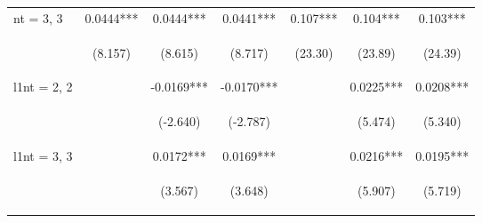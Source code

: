 \documentclass[]{article}
\begin{document}
\begin{center}
\begin{tabular}{lcccccc}
nt = 3, 3 & 0.0444*** & 0.0444*** & 0.0441*** & 0.107*** & 0.104*** & 0.103*** \\
\vspace{4pt} & \begin{footnotesize}(8.157)\end{footnotesize} & \begin{footnotesize}(8.615)\end{footnotesize} & \begin{footnotesize}(8.717)\end{footnotesize} & \begin{footnotesize}(23.30)\end{footnotesize} & \begin{footnotesize}(23.89)\end{footnotesize} & \begin{footnotesize}(24.39)\end{footnotesize} \\
l1nt = 2, 2 &  & -0.0169*** & -0.0170*** &  & 0.0225*** & 0.0208*** \\
\vspace{4pt} & \begin{footnotesize}\end{footnotesize} & \begin{footnotesize}(-2.640)\end{footnotesize} & \begin{footnotesize}(-2.787)\end{footnotesize} & \begin{footnotesize}\end{footnotesize} & \begin{footnotesize}(5.474)\end{footnotesize} & \begin{footnotesize}(5.340)\end{footnotesize} \\
l1nt = 3, 3 &  & 0.0172*** & 0.0169*** &  & 0.0216*** & 0.0195*** \\
\vspace{4pt} & \begin{footnotesize}\end{footnotesize} & \begin{footnotesize}(3.567)\end{footnotesize} & \begin{footnotesize}(3.648)\end{footnotesize} & \begin{footnotesize}\end{footnotesize} & \begin{footnotesize}(5.907)\end{footnotesize} & \begin{footnotesize}(5.719)\end{footnotesize} \\

\end{tabular}
\end{center}
\end{document}
